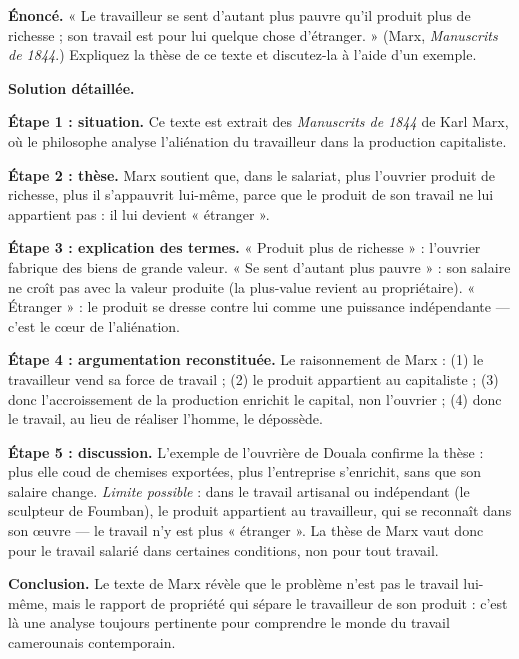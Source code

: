 \documentclass[11pt]{article}
\newcommand{\cle}[1]{{\popxbold\color{popdark}#1}}
\begin{document}
\begin{exoresolu}
\textbf{Énoncé.} « Le travailleur se sent d'autant plus pauvre qu'il produit plus de richesse ; son travail est pour lui quelque chose d'étranger. » (Marx, \emph{Manuscrits de 1844}.) Expliquez la thèse de ce texte et discutez-la à l'aide d'un exemple.

\tcblower
\textbf{Solution détaillée.}

\textbf{Étape 1 : situation.} Ce texte est extrait des \emph{Manuscrits de 1844} de Karl Marx, où le philosophe analyse l'\cle{aliénation} du travailleur dans la production capitaliste.

\textbf{Étape 2 : thèse.} Marx soutient que, dans le salariat, plus l'ouvrier produit de richesse, plus il s'appauvrit lui-même, parce que le produit de son travail ne lui appartient pas : il lui devient « étranger ».

\textbf{Étape 3 : explication des termes.} « Produit plus de richesse » : l'ouvrier fabrique des biens de grande valeur. « Se sent d'autant plus pauvre » : son salaire ne croît pas avec la valeur produite (la plus-value revient au propriétaire). « Étranger » : le produit se dresse contre lui comme une puissance indépendante — c'est le cœur de l'aliénation.

\textbf{Étape 4 : argumentation reconstituée.} Le raisonnement de Marx : (1) le travailleur vend sa force de travail ; (2) le produit appartient au capitaliste ; (3) donc l'accroissement de la production enrichit le capital, non l'ouvrier ; (4) donc le travail, au lieu de réaliser l'homme, le dépossède.

\textbf{Étape 5 : discussion.} L'exemple de l'ouvrière de Douala confirme la thèse : plus elle coud de chemises exportées, plus l'entreprise s'enrichit, sans que son salaire change. \emph{Limite possible} : dans le travail artisanal ou indépendant (le sculpteur de Foumban), le produit appartient au travailleur, qui se reconnaît dans son œuvre — le travail n'y est plus « étranger ». La thèse de Marx vaut donc pour le travail salarié dans certaines conditions, non pour tout travail.

\textbf{Conclusion.} Le texte de Marx révèle que le problème n'est pas le travail lui-même, mais le rapport de propriété qui sépare le travailleur de son produit : c'est là une analyse toujours pertinente pour comprendre le monde du travail camerounais contemporain.
\end{exoresolu}
\end{document}
